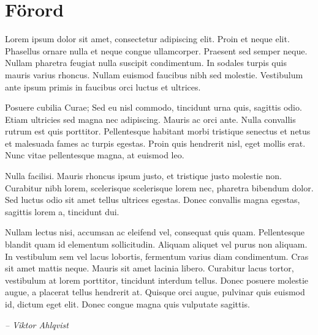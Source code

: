\chapter{Förord}
Lorem ipsum dolor sit amet, consectetur adipiscing elit. Proin et neque elit. Phasellus ornare nulla et neque congue ullamcorper. Praesent sed semper neque. Nullam pharetra feugiat nulla suscipit condimentum. In sodales turpis quis mauris varius rhoncus. Nullam euismod 
faucibus nibh sed molestie. Vestibulum ante ipsum primis in faucibus orci luctus et ultrices.

Posuere cubilia Curae; Sed eu nisl commodo, tincidunt urna quis, sagittis odio. Etiam ultricies sed magna nec adipiscing. Mauris ac orci ante. Nulla convallis rutrum est quis porttitor. Pellentesque habitant morbi tristique senectus et netus et malesuada fames ac turpis egestas. Proin quis hendrerit nisl, eget mollis erat. Nunc vitae pellentesque magna, at euismod leo.

Nulla facilisi. Mauris rhoncus ipsum justo, et tristique justo molestie non. Curabitur nibh lorem, scelerisque scelerisque lorem nec, pharetra bibendum dolor. Sed luctus odio sit amet tellus ultrices egestas. Donec convallis magna egestas, sagittis lorem a, tincidunt dui. 

Nullam lectus nisi, accumsan ac eleifend vel, consequat quis quam. Pellentesque blandit quam id elementum sollicitudin. Aliquam aliquet vel purus non aliquam. In vestibulum sem vel lacus lobortis, fermentum varius diam condimentum. Cras sit amet mattis neque. Mauris sit amet lacinia libero. Curabitur lacus tortor, vestibulum at lorem porttitor, tincidunt interdum tellus. Donec posuere molestie augue, a placerat tellus hendrerit at. Quisque orci augue, pulvinar quis euismod id, dictum eget elit. Donec congue magna quis vulputate sagittis.

\emph{-- Viktor Ahlqvist}